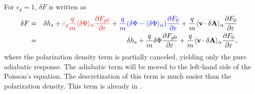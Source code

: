 \documentclass{llncs}
\newcommand{\tmcolor}[2]{{\color{#1}{#2}}}
\begin{document}
For $\epsilon_g = 1$, $\delta F$ is written as
\begin{eqnarray}
  \delta F & = & \delta h_s + \tmcolor{red}{\varepsilon_g \frac{q}{m} \langle
  \delta \Phi \rangle_{\alpha} \frac{\partial F_{g 0}}{\partial \varepsilon}}
  + \tmcolor{blue}{\frac{q}{m} (\delta \Phi - \langle \delta \Phi
  \rangle_{\alpha}) \frac{\partial F_0}{\partial \varepsilon}} + \frac{q}{m}
  \langle \mathbf{v} \cdot \delta \mathbf{A} \rangle_{\alpha} \frac{\partial
  F_0}{\partial \varepsilon} \nonumber\\
  & = & \delta h_s + \frac{q}{m} \delta \Phi \frac{\partial F_{g 0}}{\partial
  \varepsilon} + \frac{q}{m} \langle \mathbf{v} \cdot \delta \mathbf{A}
  \rangle_{\alpha} \frac{\partial F_0}{\partial \varepsilon}, 
\end{eqnarray}
where the polarization density term is partially canceled, yielding only the
pure adiabatic response. The adiabatic term will be moved to the left-hand
side of the Poisson's equation. The descretization of this term is much easier
than the polarization density. This term is already in {}.
\end{document}
